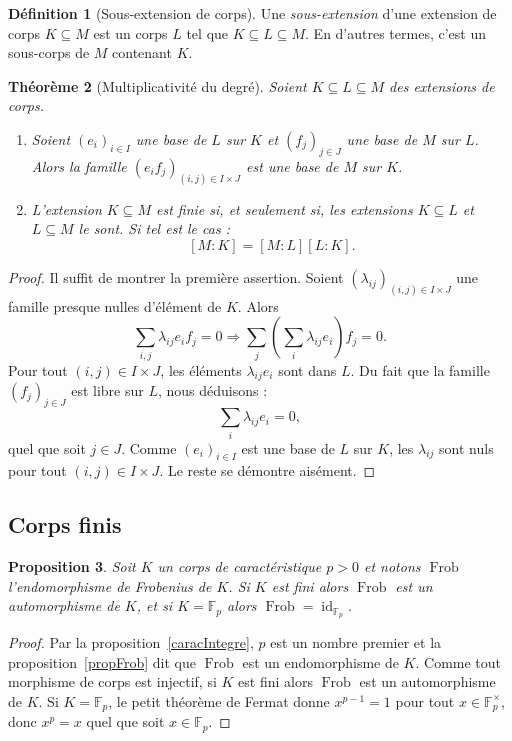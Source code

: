 \documentclass[a4paper, titlepage]{article}
\newtheorem{theo}{Théorème}[section]
\newtheorem{prop}[theo]{Proposition}
\theoremstyle{definition}
\newtheorem{defi}[theo]{Définition}
\theoremstyle{remark}
\def\F{\mathbb F}
\def\frob{\operatorname{Frob}}
\def\id{\operatorname{id}}
\begin{document}
\begin{defi}[Sous-extension de corps]
Une \textit{sous-extension} d'une extension de corps $K\subseteq M$ est un corps $L$ tel que $K\subseteq L \subseteq M$. En d'autres termes, c'est un sous-corps de $M$ contenant $K$.
\end{defi}

\begin{theo}[Multiplicativité du degré]
Soient $K\subseteq L \subseteq M$ des extensions de corps. \begin{enumerate}
\item Soient ${(e_i)}_{i\in I}$ une base de $L$ sur $K$ et ${(f_j)}_{j\in J}$ une base de $M$ sur $L$. Alors la famille ${(e_if_j)}_{(i,j)\in I\times J}$ est une base de $M$ sur $K$.
\item L'extension $K \subseteq M$ est finie si, et seulement si, les extensions $K\subseteq L$ et $L \subseteq M$ le sont. Si tel est le cas :
$$[M:K] = [M:L][L:K].$$
\end{enumerate}
\end{theo}

\begin{proof}
Il suffit de montrer la première assertion. Soient ${(\lambda_{ij})}_{(i,j)\in I\times J}$ une famille presque nulles d'élément de $K$. Alors 
$$\sum_{i,j} \lambda_{ij} e_i f_j = 0 \Rightarrow \sum_j \left( \sum_i\lambda_{ij}e_i\right) f_j = 0.$$
Pour tout $(i,j) \in I\times J$, les éléments $\lambda_{ij}e_i$ sont dans $L$. Du fait que la famille ${(f_j)}_{j\in J}$ est libre sur $L$, nous déduisons :
$$\sum_i\lambda_{ij}e_i = 0,$$
quel que soit $j \in J$. Comme ${(e_i)}_{i\in I}$ est une base de $L$ sur $K$, les $\lambda_{ij}$ sont nuls pour tout $(i,j) \in I\times J$. Le reste se démontre aisément.
\end{proof}

\subsection{Corps finis}

\begin{prop}
Soit $K$ un corps de caractéristique $p > 0$ et notons $\frob$ l'endomorphisme de Frobenius de $K$. Si $K$ est fini alors $\frob$ est un automorphisme de $K$, et si $K = \F_p$ alors $\frob = \id_{\F_p}$.
\end{prop}

\begin{proof}
Par la proposition~\ref{caracIntegre}, $p$ est un nombre premier et la proposition~\ref{propFrob} dit que $\frob$ est un endomorphisme de $K$. Comme tout morphisme de corps est injectif, si $K$ est fini alors $\frob$ est un automorphisme de $K$. Si $K = \F_p$, le petit théorème de Fermat donne $x^{p-1} = 1$ pour tout $x \in \F_p^\times$, donc $x^p =x$ quel que soit $x \in\F_p$.
\end{proof}
\end{document}
